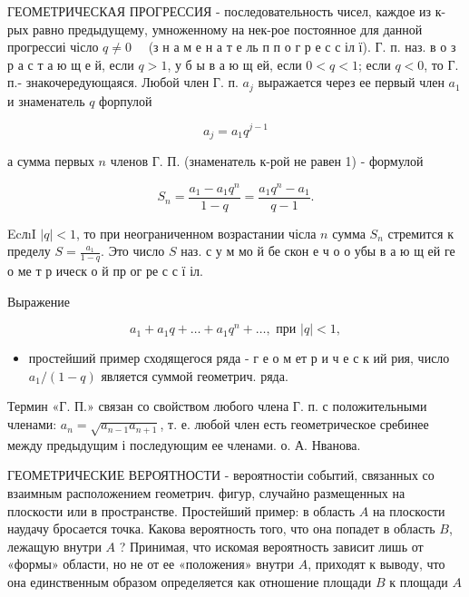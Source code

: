\documentclass[10pt]{article}
\begin{document}
ГЕОМЕТРИЧЕСКАЯ ПРОГРЕССИЯ - последовательность чисел, каждое из к-рых равно предыдущему, умноженному на нек-рое постоянное для данной прогрессиі чісло $q \neq 0 \quad$ (з н а м е н а т е ль п п о г р е с с іл ї). Г. п. наз. в о з р а с т а ю щ е й, если $q>1$, у б ы в а ю щ ей, если $0<q<1$; если $q<0$, то Г. п.- знакочередующаяся. Любой член Г. п. $a_{j}$ выражается через ее первый член $a_{1}$ и знаменатель $q$ форпулой



\[

a_{j}=a_{1} q^{j-1}

\]



а сумма первых $n$ членов Г. П. (знаменатель к-рой не равен 1) - формулой



\[

S_{n}=\frac{a_{1}-a_{1} q^{n}}{1-q}=\frac{a_{1} q^{n}-a_{1}}{q-1} .

\]



EcлıI $|q|<1$, то при неограниченном возрастании чісла $n$ сумма $S_{n}$ стремится к пределу $S=\frac{a_{1}}{1-q}$. Это число $S$ наз. с у м мо й бе скон е ч о о убы в а ю щ ей ге о ме т р ическ о й пр ог ре с с ї іл.



Выражение



\[

a_{1}+a_{1} q+\ldots+a_{1} q^{n}+\ldots, \text { при }|q|<1,

\]



\begin{itemize}

  \item простейший пример сходящегося ряда - г е о м ет р и ч е с к ий рия, число $a_{1} /(1-q)$ является суммой геометрич. ряда.

\end{itemize}



Термин «Г. П.» связан со свойством любого члена Г. п. с положительными членами: $a_{n}=\sqrt{a_{n-1} a_{n+1}}$, т. е. любой член есть геометрическое сребинее между предыдущим і последующим ее членами. о. А. Нванова.



ГЕОМЕТРИЧЕСКИЕ ВЕРОЯТНОСТИ - вероятностіи событий, связанных со взаимным расположением геометрич. фигур, случайно размещенных на плоскости или в пространстве. Простейший пример: в область $A$ на плоскости наудачу бросается точка. Какова вероятность того, что она попадет в область $B$, лежащую внутри $A$ ? Принимая, что искомая вероятность зависит лишь от «формы» области, но не от ее «положения» внутри $A$, приходят к выводу, что она единственным образом определяется как отношение площади $B$ к площади $A$
\end{document}
